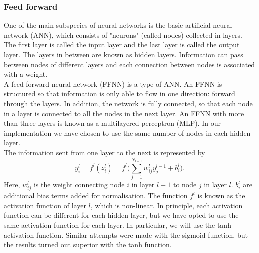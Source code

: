 \documentclass[notitlepage, reprint, nofootinbib]{revtex4-1}
\begin{document}
\subsubsection{Feed forward}
One of the main subspecies of neural networks is the basic artificial neural network (ANN), which consists of "neurons" (called nodes) collected in layers. The first layer is called the input layer and the last layer is called the output layer. The layers in between are known as hidden layers. Information can pass between nodes of different layers and each connection between nodes is associated with a weight. \\[2mm]
A feed forward neural network (FFNN) is a type of ANN. An FFNN is structured so that information is only able to flow in one direction: forward through the layers. In addition, the network is fully connected, so that each node in a layer is connected to all the nodes in the next layer. An FFNN with more than three layers is known as a multilayered perceptron (MLP). In our implementation we have chosen to use the same number of nodes in each hidden layer. \\[2mm]
The information sent from one layer to the next is represented by  
\begin{equation} y_i^l=f^l(z_i^l)=f^l\Big(\sum_{j=1}^{N_{l-1}}w_{ij}^l y_j^{l-1}+b_i^l \Big).\end{equation}
Here, $w_{ij}^{l}$ is the weight connecting node $i$ in layer $l-1$ to node $j$ in layer $l$. $b_i^l$ are additional bias terms added for normalisation. The function $f^l$ is known as the activation function of layer $l$, which is non-linear. In principle, each activation function can be different for each hidden layer, but we have opted to use the same activation function for each layer. In particular, we will use the tanh activation function. Similar attempts were made with the sigmoid function, but the results turned out superior with the tanh function.  
\end{document}
